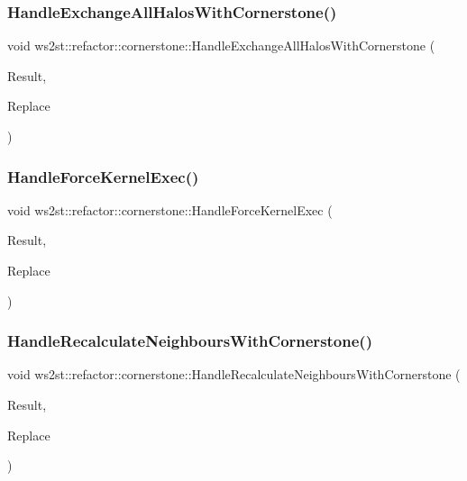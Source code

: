 \subsubsection{\texorpdfstring{Handle\+Exchange\+All\+Halos\+With\+Cornerstone()}{HandleExchangeAllHalosWithCornerstone()}}
{\footnotesize\ttfamily void ws2st\+::refactor\+::cornerstone\+::\+Handle\+Exchange\+All\+Halos\+With\+Cornerstone (\begin{DoxyParamCaption}\item[{const Match\+Finder\+::\+Match\+Result \&}]{Result,  }\item[{Replacements \&}]{Replace }\end{DoxyParamCaption})}

\mbox{\label{namespacews2st_1_1refactor_1_1cornerstone_a364556efd044a2ecffce1dc8e88708d8}} 
\subsubsection{\texorpdfstring{Handle\+Force\+Kernel\+Exec()}{HandleForceKernelExec()}}
{\footnotesize\ttfamily void ws2st\+::refactor\+::cornerstone\+::\+Handle\+Force\+Kernel\+Exec (\begin{DoxyParamCaption}\item[{const Match\+Finder\+::\+Match\+Result \&}]{Result,  }\item[{Replacements \&}]{Replace }\end{DoxyParamCaption})}

\mbox{\label{namespacews2st_1_1refactor_1_1cornerstone_a1f5a9afc86f6aa77af85a4cc548c0036}} 
\subsubsection{\texorpdfstring{Handle\+Recalculate\+Neighbours\+With\+Cornerstone()}{HandleRecalculateNeighboursWithCornerstone()}}
{\footnotesize\ttfamily void ws2st\+::refactor\+::cornerstone\+::\+Handle\+Recalculate\+Neighbours\+With\+Cornerstone (\begin{DoxyParamCaption}\item[{const Match\+Finder\+::\+Match\+Result \&}]{Result,  }\item[{Replacements \&}]{Replace }\end{DoxyParamCaption})}

